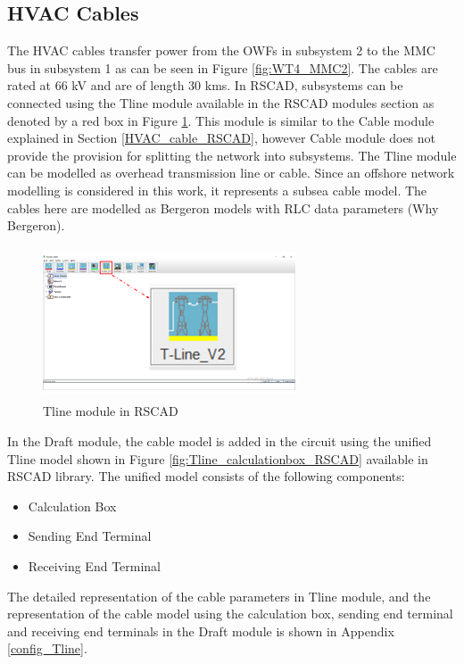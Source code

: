 \subsection{HVAC Cables}\label{Tline_cable_RSCAD}
 The \gls{HVAC} cables transfer power from the \gls{OWF}s in subsystem 2 to the \gls{MMC} bus in subsystem 1 as can be seen in Figure \ref{fig:WT4_MMC2}. The cables are rated at 66 kV and are of length 30 kms. In RSCAD, subsystems can be connected using the Tline module available in the RSCAD modules section as denoted by a red box in Figure \ref{fig:TlineModule_mark}. This module is similar to the Cable module explained in Section \ref{HVAC_cable_RSCAD}, however Cable module does not provide the provision for splitting the network into subsystems. The Tline module can be modelled as overhead transmission line or cable. Since an offshore network modelling is considered in this work, it represents a subsea cable model. The cables here are modelled as Bergeron models with RLC data parameters (Why Bergeron). 
 
 \begin{figure}[H]
\centering
    \includegraphics[height = 4.5cm,width = 7.5cm]{Diagrams/Chapter_4/Tline_module_Final.png}
    \caption{Tline module in RSCAD}
    \label{fig:TlineModule_mark}
\end{figure}
 
 In the Draft module, the cable model is added in the circuit using the unified Tline model shown in Figure \ref{fig:Tline_calculationbox_RSCAD} available in RSCAD library. The unified model consists of the following components: 
    \begin{itemize}[noitemsep]
    \item Calculation Box
    \item Sending End Terminal
    \item Receiving End Terminal
\end{itemize}

The detailed representation of the cable parameters in Tline module, and the representation of the cable model using the calculation box, sending end terminal and receiving end terminals in the Draft module is shown in Appendix \ref{config_Tline}.

